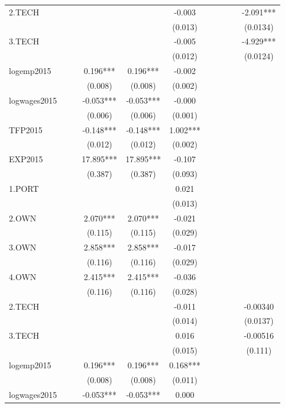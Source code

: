 \documentclass[]{article}
\begin{document}
\begin{tabular}{lcccccccccc}
2.TECH &  &  &  &  & -0.003 &  &  &  &  & -2.091*** \\
 &  &  &  &  & (0.013) &  &  &  &  & (0.0134) \\
3.TECH &  &  &  &  & -0.005 &  &  &  &  & -4.929*** \\
 &  &  &  &  & (0.012) &  &  &  &  & (0.0124) \\
logemp2015 &  &  & 0.196*** & 0.196*** & -0.002 &  &  &  &  &  \\
 &  &  & (0.008) & (0.008) & (0.002) &  &  &  &  &  \\
logwages2015 &  &  & -0.053*** & -0.053*** & -0.000 &  &  &  &  &  \\
 &  &  & (0.006) & (0.006) & (0.001) &  &  &  &  &  \\
TFP2015 &  &  & -0.148*** & -0.148*** & 1.002*** &  &  &  &  &  \\
 &  &  & (0.012) & (0.012) & (0.002) &  &  &  &  &  \\
EXP2015 &  &  & 17.895*** & 17.895*** & -0.107 &  &  &  &  &  \\
 &  &  & (0.387) & (0.387) & (0.093) &  &  &  &  &  \\
1.PORT &  &  &  &  & 0.021 &  &  &  &  &  \\
 &  &  &  &  & (0.013) &  &  &  &  &  \\
2.OWN &  &  & 2.070*** & 2.070*** & -0.021 &  &  &  &  &  \\
 &  &  & (0.115) & (0.115) & (0.029) &  &  &  &  &  \\
3.OWN &  &  & 2.858*** & 2.858*** & -0.017 &  &  &  &  &  \\
 &  &  & (0.116) & (0.116) & (0.029) &  &  &  &  &  \\
4.OWN &  &  & 2.415*** & 2.415*** & -0.036 &  &  &  &  &  \\
 &  &  & (0.116) & (0.116) & (0.028) &  &  &  &  &  \\
2.TECH &  &  &  &  & -0.011 &  &  &  &  & -0.00340 \\
 &  &  &  &  & (0.014) &  &  &  &  & (0.0137) \\
3.TECH &  &  &  &  & 0.016 &  &  &  &  & -0.00516 \\
 &  &  &  &  & (0.015) &  &  &  &  & (0.111) \\
logemp2015 &  &  & 0.196*** & 0.196*** & 0.168*** &  &  &  &  &  \\
 &  &  & (0.008) & (0.008) & (0.011) &  &  &  &  &  \\
logwages2015 &  &  & -0.053*** & -0.053*** & 0.000 &  &  &  &  &  \\

\end{tabular}
\end{document}
